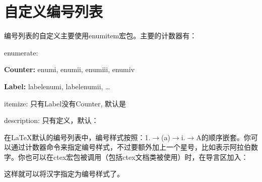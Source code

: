 \section{自定义编号列表}
\label{sec:list}
编号列表的自定义主要使用enumitem宏包。主要的计数器有：
\begin{feai}
\item enumerate: 
  \begin{feai}
    \item \textbf{Counter:} enumi, enumii, enumiii, enumiv
    \item \textbf{Label:} labelenumi, labelenumii, \ldots
  \end{feai}
\item itemize: 只有Label没有Counter, 默认是\latexline{\\textbullet}
\item description: 只有\latexline{\\descriptionlabel}定义，默认：
\begin{latex}{}
\newcomand*{}
\end{latex}
\end{feai}

在\LaTeX 默认的编号列表中，编号样式按照：1.$\rightarrow$(a)$\rightarrow$i.$\rightarrow$A的顺序嵌套。你可以通过计数器命令来指定编号样式，不过要额外加上一个星号，比如\latexline{\arabic*}表示阿拉伯数字。你也可以在ctex宏包被调用（包括ctex文档类被使用）时，在导言区加入：
\begin{latex}{}
\AddEnumerateCounter{\chinese}{\chinese}{}
\end{latex}

这样就可以将汉字指定为编号样式了。

